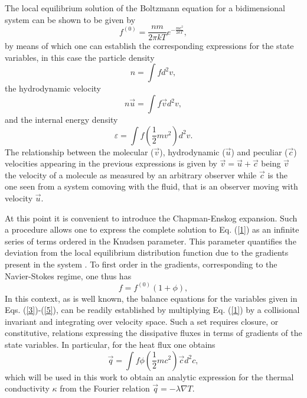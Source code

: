 \documentclass[11pt]{article} %
\begin{document}
The local equilibrium solution of the Boltzmann equation for a bidimensional
system can be shown to be given by 
\begin{equation}
f^{\left(0\right)}=\frac{nm}{2\pi kT}e^{-\frac{mc^{2}}{2kT}},\label{2}
\end{equation}
by means of which one can establish the corresponding expressions
for the state variables, in this case the particle density 
\begin{equation}
n=\int fd^{2}v,\label{3}
\end{equation}
the hydrodynamic velocity 
\begin{equation}
n\vec{u}=\int f\vec{v}d^{2}v,\label{4}
\end{equation}
and the internal energy density
\begin{equation}
\varepsilon=\int f\left(\frac{1}{2}mv^{2}\right)d^{2}v.\label{5}
\end{equation}
The relationship between the molecular ($\vec{v}$), hydrodynamic ($\vec{u}$)
and peculiar ($\vec{c}$) velocities appearing in the previous
expressions is given by $\vec{v}=\vec{u}+\vec{c}$ being $\vec{v}$
the velocity of a molecule as measured by an arbitrary observer while
$\vec{c}$ is the one seen from a system comoving with the fluid,
that is an observer moving with velocity $\vec{u}$.

At this point it is convenient to introduce the Chapman-Enskog expansion.
Such a procedure allows one to express the complete solution to Eq.
(\ref{1}) as an infinite series of terms ordered in the Knudsen parameter.
This parameter quantifies the deviation from the local equilibrium distribution
function due to the gradients present in the system \cite{Ch-E}.
To first order in the gradients, corresponding to the Navier-Stokes
regime, one thus has 
\begin{equation}
f=f^{(0)}(1+\phi),\label{6}
\end{equation}
In this context, as is well known, the balance equations for the variables given in Eqs. (\ref{3})-(\ref{5}),
can be readily established by multiplying Eq. (\ref{1}) by a collisional
invariant and integrating over velocity space. Such a set requires
closure, or constitutive, relations expressing the dissipative fluxes
in terms of gradients of the state variables. In particular, for the
heat flux one obtains 
\begin{equation}
\vec{q}=\int f\phi\left(\frac{1}{2}mc^{2}\right)\vec{c}d^{2}c,\label{7}
\end{equation}
which will be used in this work to obtain an analytic expression for
the thermal conductivity $\kappa$ from the Fourier relation $\vec{q}=-\lambda\nabla T$.
\end{document}
